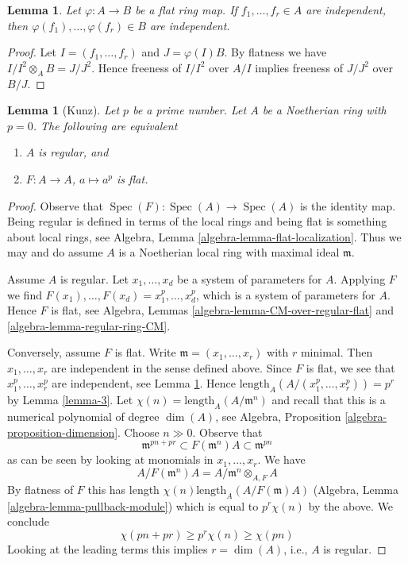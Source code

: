\documentclass{stacks-project}
\newenvironment{reference}{\comment}{\endcomment}
\theoremstyle{plain}
\newtheorem{lemma}[subsection]{Lemma}
\theoremstyle{definition}
\theoremstyle{remark}
\numberwithin{equation}{subsection}
\def\Spec{\mathop{\mathrm{Spec}}}
\begin{document}
\begin{lemma}
\label{lemma-flat-extension-independent}
Let $\varphi : A \to B$ be a flat ring map.
If $f_1, \ldots, f_r \in A$ are independent, then
$\varphi(f_1), \ldots, \varphi(f_r) \in B$ are independent.
\end{lemma}

\begin{proof}
Let $I = (f_1, \ldots, f_r)$ and $J = \varphi(I)B$. By flatness we have
$I/I^2 \otimes_A B = J/J^2$. Hence freeness of $I/I^2$ over $A/I$
implies freeness of $J/J^2$ over $B/J$.
\end{proof}

\begin{lemma}[Kunz]
\label{lemma-frobenius-flat-regular}
\begin{reference}
\cite{Kunz-flat}
\end{reference}
Let $p$ be a prime number.
Let $A$ be a Noetherian ring with $p = 0$.
The following are equivalent
\begin{enumerate}
\item $A$ is regular, and
\item $F : A \to A$, $a \mapsto a^p$ is flat.
\end{enumerate}
\end{lemma}

\begin{proof}
Observe that $\Spec(F) : \Spec(A) \to \Spec(A)$ is the identity map.
Being regular is defined in terms of the local rings and being flat
is something about local rings, see
Algebra, Lemma \ref{algebra-lemma-flat-localization}.
Thus we may and do assume $A$ is a Noetherian
local ring with maximal ideal $\mathfrak m$.

\medskip\noindent
Assume $A$ is regular. Let $x_1, \ldots, x_d$ be a
system of parameters for $A$. Applying $F$ we find
$F(x_1), \ldots, F(x_d) = x_1^p, \ldots, x_d^p$,
which is a system of parameters for $A$. Hence $F$ is flat, see
Algebra, Lemmas \ref{algebra-lemma-CM-over-regular-flat} and
\ref{algebra-lemma-regular-ring-CM}.

\medskip\noindent
Conversely, assume $F$ is flat. Write $\mathfrak m = (x_1, \ldots, x_r)$
with $r$ minimal. Then $x_1, \ldots, x_r$ are independent in the sense
defined above. Since $F$ is flat, we see that $x_1^p, \ldots, x_r^p$
are independent, see Lemma \ref{lemma-flat-extension-independent}.
Hence $\text{length}_A(A/(x_1^p, \ldots, x_r^p)) = p^r$ by
Lemma \ref{lemma-3}.
Let $\chi(n) = \text{length}_A(A/\mathfrak m^n)$ and recall
that this is a numerical polynomial of degree $\dim(A)$, see
Algebra, Proposition \ref{algebra-proposition-dimension}.
Choose $n \gg 0$. Observe that
$$
\mathfrak m^{pn + pr} \subset F(\mathfrak m^n)A \subset \mathfrak m^{pn}
$$
as can be seen by looking at monomials in $x_1, \ldots, x_r$. We have
$$
A/F(\mathfrak m^n)A = A/\mathfrak m^n \otimes_{A, F} A
$$
By flatness of $F$ this has length $\chi(n) \text{length}_A(A/F(\mathfrak m)A)$
(Algebra, Lemma \ref{algebra-lemma-pullback-module})
which is equal to $p^r\chi(n)$ by the above. We conclude
$$
\chi(pn + pr) \geq p^r\chi(n) \geq \chi(pn)
$$
Looking at the leading terms this implies $r = \dim(A)$, i.e., $A$ is regular.
\end{proof}
\end{document}
